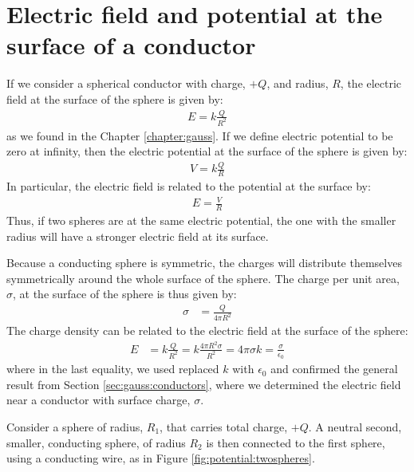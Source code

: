 \section{Electric field and potential at the surface of a conductor}
If we consider a spherical conductor with charge, $+Q$, and radius, $R$, the electric field at the surface of the sphere is given by:
\begin{align*}
E=k\frac{Q}{R^2}
\end{align*}
as we found in the Chapter \ref{chapter:gauss}. If we define electric potential to be zero at infinity, then the electric potential at the surface of the sphere is given by:
\begin{align*}
V=k\frac{Q}{R}
\end{align*}
In particular, the electric field is related to the potential at the surface by:
\begin{align*}
E=\frac{V}{R}
\end{align*}
Thus, if two spheres are at the same electric potential, the one with the smaller radius will have a stronger electric field at its surface.

Because a conducting sphere is symmetric, the charges will distribute themselves symmetrically around the whole surface of the sphere. The charge per unit area, $\sigma$, at the surface of the sphere is thus given by:
\begin{align*}
\sigma &= \frac{Q}{4\pi R^2}
\end{align*}
The charge density can be related to the electric field at the surface of the sphere:
\begin{align*}
E&=k\frac{Q}{R^2}=k\frac{4\pi R^2\sigma}{R^2}=4\pi\sigma k=\frac{\sigma}{\epsilon_0}
\end{align*}
where in the last equality, we used replaced $k$ with $\epsilon_0$ and confirmed the general result from Section \ref{sec:gauss:conductors}, where we determined the electric field near a conductor with surface charge, $\sigma$. 

Consider a sphere of radius, $R_1$, that carries total charge, $+Q$. A neutral second, smaller, conducting sphere, of radius $R_2$ is then connected to the first sphere, using a conducting wire, as in Figure \ref{fig:potential:twospheres}.

